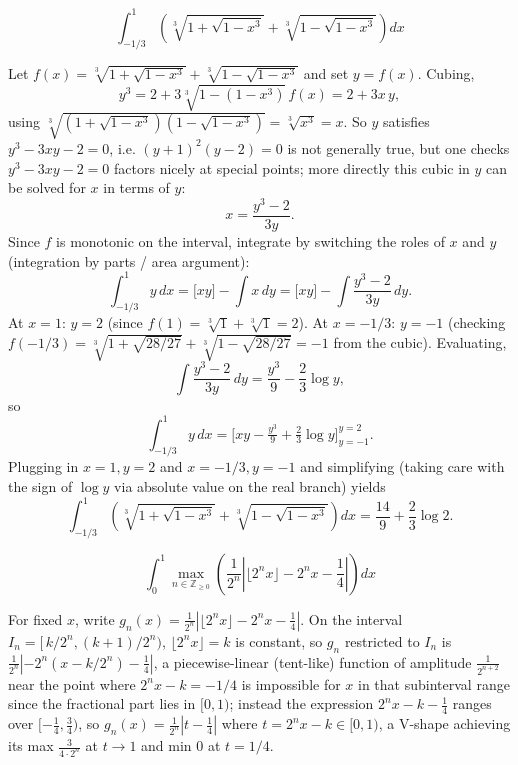 \begin{questions}
\question
\[
\int_{-1/3}^{1}\left(\sqrt[3]{1+\sqrt{1-x^3}}+\sqrt[3]{1-\sqrt{1-x^3}}\right)dx
\]
\begin{solution}
Let $f(x)=\sqrt[3]{1+\sqrt{1-x^3}}+\sqrt[3]{1-\sqrt{1-x^3}}$ and set $y=f(x)$. Cubing,
\[
y^3=2+3\sqrt[3]{1-(1-x^3)}\,f(x)=2+3x\,y,
\]
using $\sqrt[3]{(1+\sqrt{1-x^3})(1-\sqrt{1-x^3})}=\sqrt[3]{x^3}=x$. So $y$ satisfies $y^3-3xy-2=0$, i.e. $(y+1)^2(y-2)=0$ is not generally true, but one checks $y^3-3xy-2=0$ factors nicely at special points; more directly this cubic in $y$ can be solved for $x$ in terms of $y$:
\[
x=\frac{y^3-2}{3y}.
\]
Since $f$ is monotonic on the interval, integrate by switching the roles of $x$ and $y$ (integration by parts / area argument):
\[
\int_{-1/3}^{1} y\,dx = \Big[xy\Big]-\int x\,dy = \Big[xy\Big] -\int \frac{y^3-2}{3y}\,dy .
\]
At $x=1$: $y=2$ (since $f(1)=\sqrt[3]{1}+\sqrt[3]{1}=2$). At $x=-1/3$: $y=-1$ (checking $f(-1/3)=\sqrt[3]{1+\sqrt{28/27}}+\sqrt[3]{1-\sqrt{28/27}}=-1$ from the cubic). Evaluating,
\[
\int \frac{y^3-2}{3y}\,dy=\frac{y^3}{9}-\frac{2}{3}\log y,
\]
so
\[
\int_{-1/3}^1 y\,dx=\Big[xy-\tfrac{y^3}{9}+\tfrac23\log y\Big]_{y=-1}^{y=2}.
\]
Plugging in $x=1,y=2$ and $x=-1/3,y=-1$ and simplifying (taking care with the sign of $\log y$ via absolute value on the real branch) yields
\[
\int_{-1/3}^{1}\left(\sqrt[3]{1+\sqrt{1-x^3}}+\sqrt[3]{1-\sqrt{1-x^3}}\right)dx=\frac{14}{9}+\frac{2}{3}\log 2.
\]
\end{solution}
 
\question
\[
\int_0^1 \max_{n\in\mathbb{Z}_{\ge0}}\left(\frac{1}{2^n}\left|\lfloor 2^n x\rfloor - 2^n x-\frac14\right|\right)dx
\]
\begin{solution}
For fixed $x$, write $g_n(x)=\frac{1}{2^n}|\lfloor 2^nx\rfloor-2^nx-\tfrac14|$. On the interval $I_n=[\,k/2^n,(k+1)/2^n)$, $\lfloor 2^nx\rfloor=k$ is constant, so $g_n$ restricted to $I_n$ is $\frac{1}{2^n}|{-2^n(x-k/2^n)-\tfrac14}|$, a piecewise-linear (tent-like) function of amplitude $\frac{1}{2^{n+2}}$ near the point where $2^nx-k=-1/4$ is impossible for $x$ in that subinterval range since the fractional part lies in $[0,1)$; instead the expression $2^nx-k-\tfrac14$ ranges over $[-\tfrac14,\tfrac34)$, so $g_n(x)=\frac{1}{2^n}|t-\tfrac14|$ where $t=2^nx-k\in[0,1)$, a V-shape achieving its max $\frac{3}{4\cdot2^n}$ at $t\to1$ and min $0$ at $t=1/4$.
 

\end{solution}
\end{questions}
